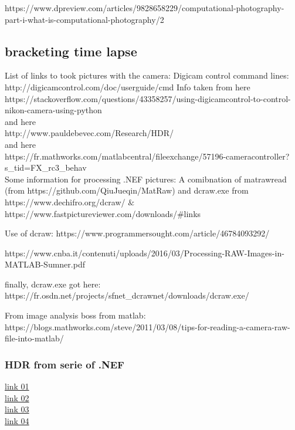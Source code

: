 \documentclass[twocolumn,amsmath,amssymb,floatfix]{revtex4}
\begin{document}
https://www.dpreview.com/articles/9828658229/computational-photography-part-i-what-is-computational-photography/2

\subsection{bracketing time lapse}

List of links to took pictures with the camera:
Digicam control command lines: http://digicamcontrol.com/doc/userguide/cmd 
Info taken from here\\ https://stackoverflow.com/questions/43358257/using-digicamcontrol-to-control-nikon-camera-using-python \\ 
and here \\
http://www.pauldebevec.com/Research/HDR/  \\
and here\\
https://fr.mathworks.com/matlabcentral/fileexchange/57196-cameracontroller?s_tid=FX_rc3_behav \\

Some information for processing .NEF pictures:
A comibnation of matrawread (from https://github.com/QiuJueqin/MatRaw) and dcraw.exe from https://www.dechifro.org/dcraw/
$\&$ https://www.fastpictureviewer.com/downloads/#links

Use of dcraw: https://www.programmersought.com/article/46784093292/

https://www.cnba.it/contenuti/uploads/2016/03/Processing-RAW-Images-in-MATLAB-Sumner.pdf

finally, dcraw.exe got here: https://fr.osdn.net/projects/sfnet_dcrawnet/downloads/dcraw.exe/

From image analysis boss from matlab:
https://blogs.mathworks.com/steve/2011/03/08/tips-for-reading-a-camera-raw-file-into-matlab/


\subsubsection{HDR from serie of .NEF}

\noindent \href{https://pypi.org/project/rawhdr/}{link 01}\\
\noindent \href{https://github.com/fthaler/rawhdr}{link 02}\\
\noindent \href{https://learnopencv.com/high-dynamic-range-hdr-imaging-using-opencv-cpp-python/}{link 03}\\
\noindent \href{https://stackoverflow.com/questions/30010227/how-could-i-get-the-raw-pixel-data-out-of-a-nef-file-using-python}{link 04}\\
\end{document}
